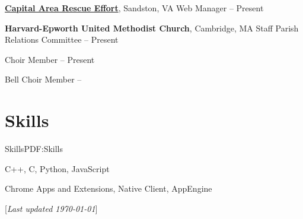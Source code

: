 \documentclass[letterpaper,MMMyyyy,nonstop]{simpleresumecv}
\newcommand{\CVNote}{Last updated {\today}}
\begin{document}
\begin{body}
\href{http://www.carerva.com}{\textbf{Capital Area Rescue Effort}}, Sandston, VA
\GapNoBreak
\BulletItem
Web Manager
\hfill
{} -- Present

\BigGap

\textbf{Harvard-Epworth United Methodist Church}, Cambridge, MA
\GapNoBreak
\BulletItem
Staff Parish Relations Committee
\hfill
{} -- Present

\BulletItem
Choir Member
\hfill
{} -- Present

\BulletItem
Bell Choir Member
\hfill
{} -- 


\section{Skills}{Skills}{PDF:Skills}

C++,
C,
Python,
JavaScript

\Gap

Chrome Apps and Extensions,
Native Client,
AppEngine


\end{body}

\UseNoteFont%
\null\hfill%
[\textit{\CVNote}]%
\hspace{2.0mm}\null
\end{document}
